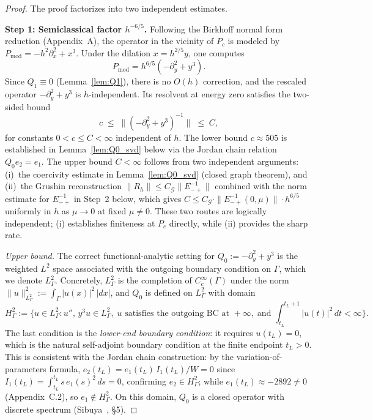 \documentclass[12pt,a4paper]{amsart}
\theoremstyle{remark}
\begin{document}
\begin{proof}
The proof factorizes into two independent estimates.

\textbf{Step 1: Semiclassical factor $h^{-6/5}$.}
Following the Birkhoff normal form reduction (Appendix~A), the operator in the vicinity of $P_c$ is modeled by
$P_{\mathrm{mod}} = -h^2\partial_x^2 + x^3$.
Under the dilation $x = h^{2/5}y$, one computes
\[
  P_{\mathrm{mod}} = h^{6/5}(-\partial_y^2 + y^3).
\]
Since $Q_1 \equiv 0$ (Lemma~\ref{lem:Q1}), there is no $O(h)$ correction,
and the rescaled operator $-\partial_y^2 + y^3$ is $h$-independent.
Its resolvent at energy zero satisfies the two-sided bound
\[
  c \;\leq\; \|(-\partial_y^2+y^3)^{-1}\| \;\leq\; C,
\]
for constants $0 < c \leq C < \infty$ independent of $h$.
The lower bound $c \approx 505$ is established in Lemma~\ref{lem:Q0_svd} below
via the Jordan chain relation $Q_0 e_2 = e_1$.
The upper bound $C < \infty$ follows from two independent arguments:
(i)~the coercivity estimate in Lemma~\ref{lem:Q0_svd} (closed graph theorem),
and (ii)~the Grushin reconstruction $\|R_h\| \leq C_{\mathcal{G}}\|E_{-+}^{-1}\|$
combined with the norm estimate for $E_{-+}^{-1}$ in Step~2 below,
which gives $C \leq C_{\mathcal{G}}\cdot\|E_{-+}^{-1}(0,\mu)\|\cdot h^{6/5}$
uniformly in $h$ as $\mu \to 0$ at fixed $\mu \neq 0$.
These two routes are logically independent; (i) establishes finiteness
at $P_c$ directly, while (ii) provides the sharp rate.

\emph{Upper bound.}
The correct functional-analytic setting for $Q_0 := -\partial_y^2 + y^3$ is the
weighted $L^2$ space associated with the outgoing boundary condition on $\Gamma$,
which we denote $L^2_\Gamma$.
Concretely, $L^2_\Gamma$ is the completion of $C_c^\infty(\Gamma)$ under the norm
$\|u\|_{L^2_\Gamma}^2 := \int_\Gamma |u(x)|^2\,|dx|$,
and $Q_0$ is defined on $L^2_\Gamma$ with domain
\begin{equation}\label{eq:H2Gamma_domain}
H^2_\Gamma := \bigl\{u \in L^2_\Gamma : u'',\, y^3 u \in L^2_\Gamma,\;
u \text{ satisfies the outgoing BC at } +\infty,\;
\text{and } \int_{t_L}^{t_L+1} |u(t)|^2\,dt < \infty \bigr\}.
\end{equation}
The last condition is the \emph{lower-end boundary condition}: it requires
$u(t_L) = 0$, which is the natural self-adjoint boundary condition at the
finite endpoint $t_L > 0$.
This is consistent with the Jordan chain construction: by the
variation-of-parameters formula, $e_2(t_L) = e_1(t_L)\,I_1(t_L)/W = 0$
since $I_1(t_L) = \int_{t_L}^{t_L} s\,e_1(s)^2\,ds = 0$,
confirming $e_2 \in H^2_\Gamma$; while $e_1(t_L) \approx -2892 \neq 0$
(Appendix~C.2), so $e_1 \notin H^2_\Gamma$.
On this domain, $Q_0$ is a closed operator with discrete spectrum
(Sibuya~\cite{Sibuya75}, \S5).


\end{proof}
\end{document}
